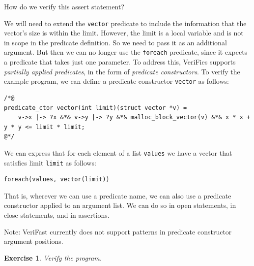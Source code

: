 \documentclass{article}
\newtheorem{exercise}{Exercise}
\begin{document}
How do we verify this assert statement?

We will need to extend the \lstinline!vector! predicate to
include the information that the vector's size is within the
limit. However, the limit is a local variable and is not in
scope in the predicate definition. So we need to pass it as an
additional argument. But then we can no longer use the
\lstinline!foreach! predicate, since it expects a predicate
that takes just one parameter. To address this, VeriFies
supports \emph{partially applied predicates}, in the form of
\emph{predicate constructors}. To verify the example program,
we can define a predicate constructor \lstinline!vector! as
follows:
\begin{lstlisting}
/*@
predicate_ctor vector(int limit)(struct vector *v) =
    v->x |-> ?x &*& v->y |-> ?y &*& malloc_block_vector(v) &*& x * x + y * y <= limit * limit;
@*/
\end{lstlisting}
We can express that for each element of a list
\lstinline!values! we have a vector that satisfies limit
\lstinline!limit! as follows:
\begin{lstlisting}
foreach(values, vector(limit))
\end{lstlisting}
That is, wherever we can use a predicate name, we can also use
a predicate constructor applied to an argument list. We can do
so in open statements, in close statements, and in assertions.

Note: VeriFast currently does not support patterns in predicate
constructor argument positions.

\begin{exercise}\label{exercise:predctors}
Verify the program.
\end{exercise}

%
%
%
%
%
\end{document}
